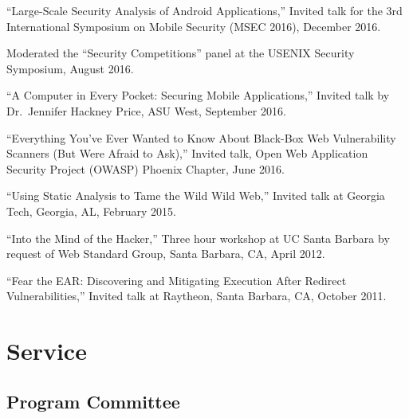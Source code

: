 \documentclass[11pt,letterpaper,sans]{moderncv}
\begin{document}
\begin{etaremune}
  \item ``Large-Scale Security Analysis of Android Applications,''
    Invited talk for the 3rd International Symposium on Mobile
    Security (MSEC 2016), December 2016.

  \item Moderated the ``Security Competitions'' panel at the USENIX
    Security Symposium, August 2016.

  \item ``A Computer in Every Pocket: Securing Mobile Applications,''
    Invited talk by Dr.\ Jennifer Hackney Price, ASU West, September
    2016.

  \item ``Everything You've Ever Wanted to Know About Black-Box Web
    Vulnerability Scanners (But Were Afraid to Ask),'' Invited talk,
    Open Web Application Security Project (OWASP) Phoenix Chapter,
    June 2016.

  \item ``Using Static Analysis to Tame the Wild Wild Web,'' Invited
    talk at Georgia Tech, Georgia, AL, February 2015.
 
  \item ``Into the Mind of the Hacker,'' Three hour workshop at UC
    Santa Barbara by request of Web Standard Group, Santa Barbara, CA,
    April 2012.

  \item ``Fear the EAR: Discovering and Mitigating Execution After
    Redirect Vulnerabilities,'' Invited talk at Raytheon, Santa
    Barbara, CA, October 2011.

\end{etaremune}

\section{Service}

\subsection{Program Committee}
\end{document}
